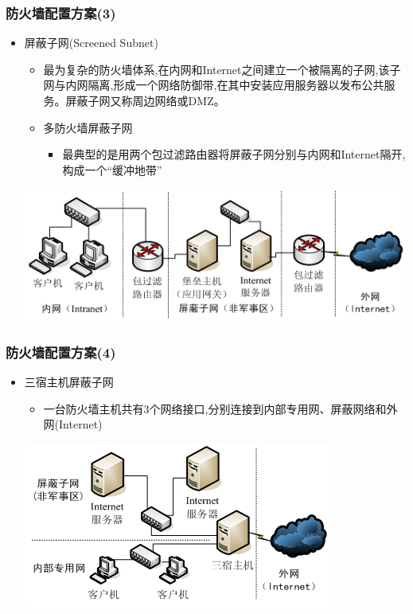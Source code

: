 \documentclass[xcolor=svgnames,presentation]{beamer}
\begin{document}
\begin{frame}
\frametitle{防火墙配置方案(3)}
\label{sec-1-7}
\begin{itemize}

\item 屏蔽子网(Screened Subnet)
\label{sec-1-7-1}%
\begin{itemize}

\item 最为复杂的防火墙体系,在内网和Internet之间建立一个被隔离的子网,该子网与内网隔离,形成一个网络防御带,在其中安装应用服务器以发布公共服务。屏蔽子网又称周边网络或DMZ。
\label{sec-1-7-1-1}%

\item 多防火墙屏蔽子网
\label{sec-1-7-1-2}%
\begin{itemize}

\item 最典型的是用两个包过滤路由器将屏蔽子网分别与内网和Internet隔开,构成一个“缓冲地带”
\label{sec-1-7-1-2-1}%
\end{itemize} %
\end{itemize} %
\label{sec-1-7-1-3}

\includegraphics[width=.9\linewidth]{img/firewall7.png}
\end{itemize} %
\end{frame}
\begin{frame}
\frametitle{防火墙配置方案(4)}
\label{sec-1-8}
\begin{itemize}

\item 三宿主机屏蔽子网
\label{sec-1-8-1}%
\begin{itemize}

\item 一台防火墙主机共有3个网络接口,分别连接到内部专用网、屏蔽网络和外网(Internet)
\label{sec-1-8-1-1}%
\end{itemize} %
\label{sec-1-8-1-2}

\includegraphics[width=.9\linewidth]{img/firewall8.png}
\end{itemize} %
\end{frame}
\end{document}
